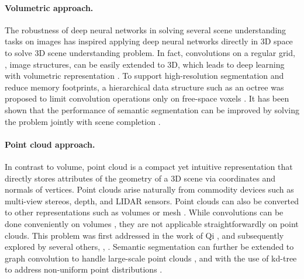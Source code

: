 \documentclass[10pt,twocolumn,letterpaper]{article}
\begin{document}
\paragraph{Volumetric approach.}
The robustness of deep neural networks in solving several scene understanding
tasks on images has inspired applying deep neural networks directly in 3D space
to solve 3D scene understanding problem. In fact, convolutions on a regular
grid, \eg, image structures, can be easily extended to 3D, which leads to deep
learning with volumetric representation \cite{wu-shapenets-cvpr15,
  maturana-voxnet-iros15, nguyen-field-cvpr16}. To support high-resolution
segmentation and reduce memory footprints, a hierarchical data structure such as
an octree was proposed to limit convolution operations only on free-space voxels
\cite{riegler-octnet-cvpr17}. It has been shown that the performance of semantic
segmentation can be improved by solving the problem jointly with scene
completion \cite{song-sscnet-cvpr17, dai-scancomplete-cvpr18}.

\paragraph{Point cloud approach.}
In contrast to volume, point cloud is a compact yet intuitive representation
that directly stores attributes of the geometry of a 3D scene via coordinates
and normals of vertices. Point clouds arise naturally from commodity devices
such as multi-view stereos, depth, and LIDAR sensors. Point clouds can also be
converted to other representations such as volumes \cite{tchapmi-segcloud-3dv17}
or mesh \cite{valentin-mesh-cvpr13}. While convolutions can be done conveniently
on volumes \cite{tchapmi-segcloud-3dv17}, they are not applicable
straightforwardly on point clouds. This problem was first addressed in the work
of Qi \etal \cite{qi-pointnet-cvpr17}, and subsequently explored by several
others, \eg, \cite{qi-pointnet++-nips17, hua-pointwise-cvpr18,
  wang-dgcnn-arxiv18, huang-rsnet-cvpr18, li-pointcnn-nips18, li-sonet-cvpr18,
  xu-spidercnn-eccv18}. Semantic segmentation can further be extended to graph
convolution to handle large-scale point clouds
\cite{landrieu-superpoint-cvpr18}, and with the use of kd-tree to address
non-uniform point distributions \cite{klokov-escape-iccv17,
  groh-flexconv-accv18}.
\end{document}
